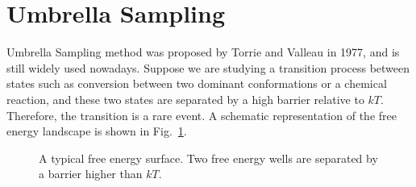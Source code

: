 \section{Umbrella Sampling\label{Sec:ES:US}}
Umbrella Sampling method was proposed by Torrie and Valleau in 1977,\cite{TorrieJComputP1977} and is still widely used nowadays.
Suppose we are studying a transition process between states such as conversion between two dominant conformations or a chemical reaction, and these two states are separated by a high barrier relative to $kT$. Therefore, the transition is a rare event. A schematic representation of the free energy landscape is shown in Fig.~\ref{Fig:ES:dual_harmonic}.
\begin{figure}[htbp]
	\centering
	\caption{A typical free energy surface. Two free energy wells are separated by a barrier higher than $kT$.}\label{Fig:ES:dual_harmonic}
\end{figure}


